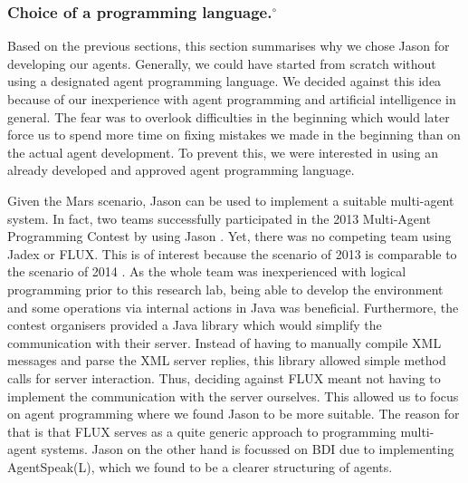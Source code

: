 \subsubsection[Choice of a programming language.]{Choice of a programming language.$^\circ$}\label{fun:apl_choice}
Based on the previous sections, this section summarises why we chose Jason for developing our agents.
Generally, we could have started from scratch without using a designated agent programming language. We decided against this idea because of our inexperience with agent programming and artificial intelligence in general. The fear was to overlook difficulties in the beginning which would later force us to spend more time on fixing mistakes we made in the beginning than on the actual agent development. To prevent this, we were interested in using an already developed and approved agent programming language.

Given the Mars scenario, Jason can be used to implement a suitable multi-agent system. In fact, two teams successfully participated in the 2013 Multi-Agent Programming Contest by using Jason \cite{ahlbrecht_multi_2013}. %
Yet, there was no competing team using Jadex or FLUX.
This is of interest because the scenario of 2013 is comparable to the scenario of 2014 \cite{ahlbrecht_mapc_2014}. %
As the whole team was inexperienced with logical programming prior to this research lab, being able to develop the environment and some operations via internal actions in Java was beneficial. Furthermore, the contest organisers provided a Java library which would simplify the communication with their server. Instead of having to manually compile XML messages and parse the XML server replies, this library allowed simple method calls for server interaction. Thus, deciding against FLUX meant not having to implement the communication with the server ourselves. This allowed us to focus on agent programming where we found Jason to be more suitable. The reason for that is that FLUX serves as a quite generic approach to programming multi-agent systems. Jason on the other hand is focussed on BDI due to implementing AgentSpeak(L), which we found to be a clearer structuring of agents.

